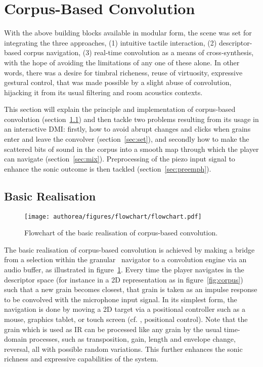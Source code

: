 \section{Corpus-Based Convolution} %

With the above building blocks available in modular form, the scene was set for integrating the three approaches, (1) intuitive tactile interaction, (2) descriptor-based corpus navigation, (3) real-time convolution as a means of cross-\hspace{0pt}synthesis, with the hope of avoiding the limitations of any one of these alone. In other words, there was a desire for timbral richeness, reuse of virtuosity, expressive gestural control, that was made possible by a slight abuse of convolution, hijacking it from its usual filtering and room acoustics contexts.

This section will explain the principle and implementation of corpus-based convolution (section~\ref{sec:basic}) and then tackle two problems resulting from its usage in an interactive DMI: 
firstly, how to avoid abrupt changes and clicks when grains enter and leave the convolver (section~\ref{sec:set}), and secondly 
how to make the scattered bits of sound in the corpus into a smooth map through which the player can navigate (section~\ref{sec:mix}). Preprocessing of the piezo input signal to enhance the sonic outcome is then tackled (section~\ref{sec:preemph}).

\subsection{Basic Realisation}\label{sec:basic}

\begin{figure}[tb] 
\texttt{[image: authorea/figures/flowchart/flowchart.pdf]} 
\caption{Flowchart of the basic realisation of corpus-based convolution.}
\label{fig:schema} 
\end{figure} 

The basic realisation of corpus-based convolution is achieved by making a bridge from a selection within the granular \cbcs\ navigator to a convolution engine via an audio buffer, as illustrated in figure~\ref{fig:schema}.  Every time the player navigates in the descriptor space (for instance in a 2D representation as in figure~\ref{fig:corpus}) such that a new grain becomes closest, that grain is taken as an impulse response to be convolved with the microphone input signal.  In its simplest form, the navigation is done by moving a 2D target via a positional controller such as a mouse, graphics tablet, or touch screen (cf. \cite{Schwarz-nime2012-sound-space}, positional control).
%
Note that the grain which is used as IR can be processed like any grain by the usual time-domain processes, such as transposition, gain, length and envelope change, reversal, all with possible random variations. This further enhances the sonic richness and expressive capabilities of the system.

